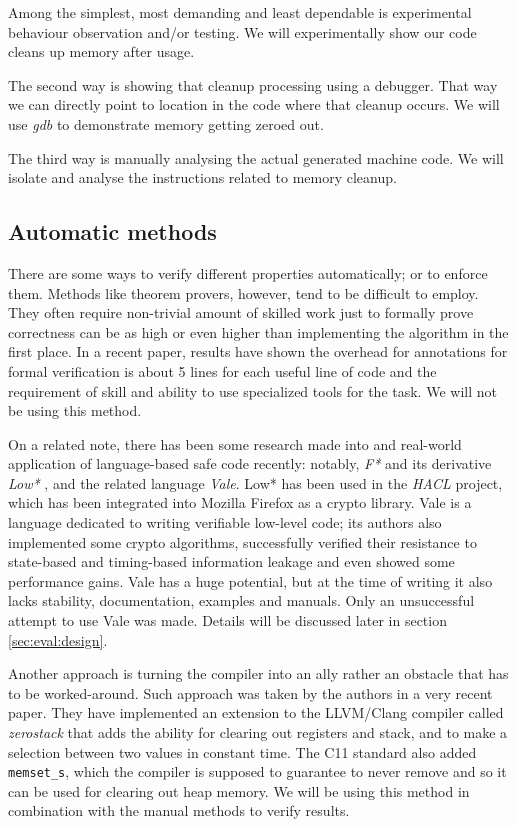 \documentclass[a4paper,10pt,openright]{memoir}
\newcommand{\term}[1]{\textit{#1}}
\newcommand{\code}[1]{\texttt{#1}}
\begin{document}
Among the simplest, most demanding and least dependable is experimental 
behaviour observation and/or testing. We will experimentally show our 
code cleans up memory after usage.

The second way is showing that cleanup processing using a debugger. 
That way we can directly point to location in the code where that 
cleanup occurs. We will use \term{gdb} to demonstrate memory getting 
zeroed out.

The third way is manually analysing the actual generated machine code. 
We will isolate and analyse the instructions related to memory cleanup.

\subsection{Automatic methods}
\label{sec:verifmet}

There are some ways to verify different properties automatically; or to 
enforce them. Methods like theorem provers, however, tend to be 
difficult to employ. They often require non-trivial amount of skilled 
work just to formally prove correctness can be as high or even higher 
than implementing the algorithm in the first place. In a recent 
paper\cite{ironclad}, results have shown the overhead for annotations 
for formal verification is about 5 lines for each useful line of code 
and the requirement of skill and ability to use specialized tools for 
the task. We will not be using this method.

On a related note, there has been some research made into and 
real-world application of language-based safe code recently: notably, 
\term{F*} and its derivative \term{Low*} \cite{Low*}, and the related 
language \term{Vale}\cite{vale2017}. Low* has been used in the 
\term{HACL} project, which has been integrated into Mozilla Firefox as 
a crypto library. Vale is a language dedicated to writing verifiable 
low-level code; its authors also implemented some crypto algorithms, 
successfully verified their resistance to state-based and timing-based 
information leakage and even showed some performance gains. Vale has a 
huge potential, but at the time of writing it also lacks stability, 
documentation, examples and manuals. Only an unsuccessful attempt to 
use Vale was made. Details will be discussed later in section 
\ref{sec:eval:design}.

Another approach is turning the compiler into an ally rather an 
obstacle that has to be worked-around. Such approach was taken by the 
authors in a very recent paper\cite{whatyouc}. They have implemented an 
extension to the LLVM/Clang compiler called \term{zerostack} that adds 
the ability for clearing out registers and stack, and to make a 
selection between two values in constant time. The C11 standard also 
added \code{memset\_s}, which the compiler is supposed to guarantee to 
never remove and so it can be used for clearing out heap memory. We 
will be using this method in combination with the manual methods to 
verify results.
\end{document}
